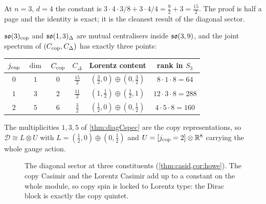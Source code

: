 At $n=3$, $d=4$ the constant is $3\cdot4\cdot3/8+3\cdot4/4=\tfrac92+3=\tfrac{15}2$. The proof is half a page and the identity is exact; it is
the cleanest result of the diagonal sector.

\begin{corollary}
\label{cor:howe}
$\mathfrak{so}(3)_{\rm cop}$ and $\mathfrak{so}(1,3)_\Delta$ are mutual centralisers inside $\mathfrak{so}(3,9)$, and the joint spectrum of $(C_{\rm cop},C_\Delta)$ has exactly
three points:
\begin{center}
\begin{tabular}{@{}cccccc@{}}
\toprule
$j_{\rm cop}$ & $\dim$ & $C_{\rm cop}$ & $C_\Delta$ & Lorentz content & rank in $S_3$\\
\midrule
$0$ & $1$ & $0$ & $\tfrac{15}2$ & $(\tfrac32,0)\oplus(0,\tfrac32)$ & $8\cdot1\cdot8=64$\\
$1$ & $3$ & $2$ & $\tfrac{11}2$ & $(1,\tfrac12)\oplus(\tfrac12,1)$ & $12\cdot3\cdot8=288$\\
$2$ & $5$ & $6$ & $\tfrac32$ & $(\tfrac12,0)\oplus(0,\tfrac12)$ & $4\cdot5\cdot8=160$\\
\bottomrule
\end{tabular}
\end{center}
The multiplicities $1,3,5$ of \cref{thm:diagCspec} are the copy representations, so $\mathcal D\cong L\otimes U$ with
$L=(\tfrac12,0)\oplus(0,\tfrac12)$ and $U=[j_{\rm cop}=2]\otimes\mathbb{R}^8$ carrying the whole gauge action.
\end{corollary}

\begin{figure}[t]
\centering
{}
\caption{The diagonal sector at three constituents (\cref{thm:casid,cor:howe}). The copy Casimir and the Lorentz Casimir add up to a constant
on the whole module, so copy spin is locked to Lorentz type: the Dirac block is exactly the copy quintet.}
\label{fig:dualpair}
\end{figure}

